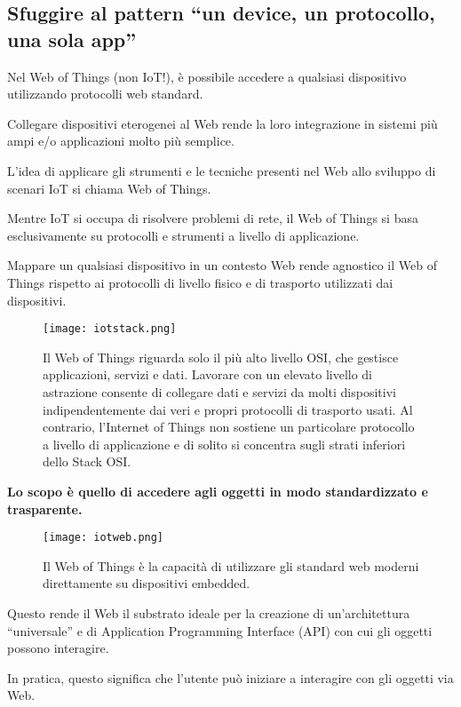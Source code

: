 \subsection{Sfuggire al pattern ``un device, un protocollo, una sola app''}

Nel Web of Things (non IoT!), è possibile accedere a qualsiasi dispositivo
utilizzando protocolli web standard.

Collegare dispositivi eterogenei al Web rende la loro integrazione in sistemi
più ampi e/o applicazioni molto più semplice.

L'idea di applicare gli strumenti e le tecniche presenti nel
Web allo sviluppo di scenari IoT si chiama Web of Things.

Mentre IoT si occupa di risolvere problemi di rete, il Web of Things si basa
esclusivamente su protocolli e strumenti a livello di applicazione.

Mappare un qualsiasi dispositivo in un contesto Web rende agnostico il
Web of Things rispetto ai protocolli di livello fisico e di trasporto
utilizzati dai dispositivi.

\begin{figure}[H]
  \centering
  \texttt{[image: iotstack.png]}
  \caption{Il Web of Things riguarda solo il più alto livello OSI, che
gestisce applicazioni, servizi e dati.
Lavorare con un elevato livello di astrazione consente di collegare dati
e servizi da molti dispositivi indipendentemente dai veri e propri protocolli
di trasporto usati.
Al contrario, l'Internet of Things non sostiene un particolare protocollo a
livello di applicazione e di solito si concentra sugli strati inferiori dello
Stack OSI.}
  \label{fig:iotstack}
\end{figure}

\textbf{Lo scopo è quello di accedere agli oggetti in modo standardizzato e
trasparente.}

\begin{figure}[H]
  \centering
  \texttt{[image: iotweb.png]}
  \caption{Il Web of Things è la capacità di utilizzare gli standard web
moderni direttamente su dispositivi embedded.}
  \label{fig:iotweb}
\end{figure}

Questo rende il Web il substrato ideale per la creazione di un'architettura
``universale'' e di Application Programming Interface (API) con cui gli
oggetti possono interagire.

In pratica, questo significa che l'utente può iniziare a interagire con gli
oggetti via Web.

